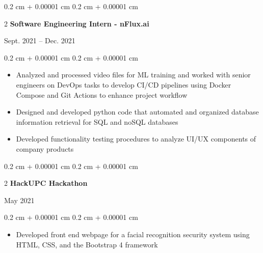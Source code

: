 \documentclass[10pt, letterpaper]{article}
\newenvironment{highlightsforbulletentries}{
    \begin{itemize}[
        topsep=0.10 cm,
        parsep=0.10 cm,
        partopsep=0pt,
        itemsep=0pt,
        leftmargin=10pt
    ]
}{
    \end{itemize}
} %
\newenvironment{onecolentry}{
    \begin{adjustwidth}{
        0.2 cm + 0.00001 cm
    }{
        0.2 cm + 0.00001 cm
    }
}{
    \end{adjustwidth}
} %
\newenvironment{twocolentry}[2][]{
    \onecolentry
    \def\secondColumn{#2}
    \setcolumnwidth{\fill, 4.5 cm}
    \begin{paracol}{2}
}{
    \switchcolumn \raggedleft \secondColumn
    \end{paracol}
    \endonecolentry
} %
\begin{document}
        \vspace{0.2 cm}

        \begin{twocolentry}{
            Sept. 2021 – Dec. 2021
        }{
            \textbf{Software Engineering Intern - nFlux.ai}
        }
        \end{twocolentry}
        \vspace{0.1 cm}
        \begin{onecolentry}
            \begin{highlightsforbulletentries}
                \item Analyzed and processed video files for ML training and worked with senior engineers on DevOps
                tasks to develop CI/CD pipelines using Docker Compose and Git Actions to enhance project workflow
                \item Designed and developed python code that automated and organized database information retrieval
                for SQL and noSQL databases
                \item Developed functionality testing procedures to analyze UI/UX components of company products
            \end{highlightsforbulletentries}
        \end{onecolentry}

        \vspace{0.2 cm}

        \begin{twocolentry}{
            May 2021
        }{
            \textbf{HackUPC Hackathon}
        }
        \end{twocolentry}
        \vspace{0.1 cm}
        \begin{onecolentry}
            \begin{highlightsforbulletentries}
                \item Developed front end webpage for a facial recognition security system using HTML, CSS, and the
                Bootstrap 4 framework
            \end{highlightsforbulletentries}
        \end{onecolentry}
\end{document}
